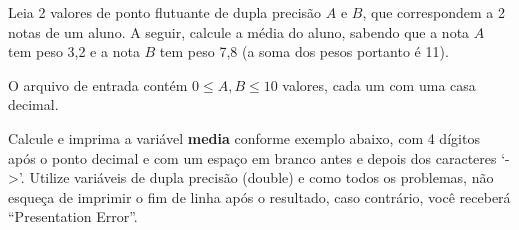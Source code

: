 
%
%
%
%

Leia 2 valores de ponto flutuante de dupla precisão $A$ e $B$, que correspondem a 2 notas de um aluno. A seguir, calcule a média do aluno, sabendo que a nota $A$ tem peso 3,2 e a nota $B$ tem peso 7,8 (a soma dos pesos portanto é 11).

\Entrada%
O arquivo de entrada contém $0 \leq A, B \leq 10$ valores, cada um com uma casa decimal.

\Saida%
Calcule e imprima a variável \textbf{media} conforme exemplo abaixo, com 4 dígitos após o ponto decimal e com um espaço em branco antes e depois dos caracteres `->'. Utilize variáveis de dupla precisão (double) e como todos os problemas, não esqueça de imprimir o fim de linha após o resultado, caso contrário, você receberá ``Presentation Error''.

%
